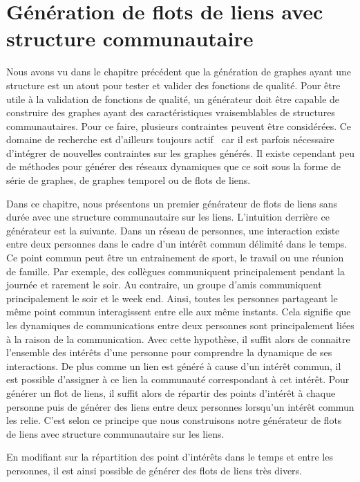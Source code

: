 \chapter{Génération de flots de liens avec structure communautaire}
\minitoc
\label{versQualite}

Nous avons vu dans le chapitre précédent que la génération de graphes ayant une structure est un atout pour tester et valider des fonctions de qualité.
Pour être utile à la validation de fonctions de qualité, un générateur doit être capable de construire des graphes ayant des caractéristiques vraisemblables de structures communautaires.
Pour ce faire, plusieurs contraintes peuvent être considérées.
Ce domaine de recherche est d'ailleurs toujours actif~\cite{Tabourier2011,Obradovic2014} car il est parfois nécessaire d'intégrer de nouvelles contraintes sur les graphes générés.
Il existe cependant peu de méthodes pour générer des réseaux dynamiques que ce soit sous la forme de série de graphes, de graphes temporel ou de flots de liens.


Dans ce chapitre, nous présentons un premier générateur de flots de liens sans durée avec une structure communautaire sur les liens.
L'intuition derrière ce générateur est la suivante.
Dans un réseau de personnes, une interaction existe entre deux personnes dans le cadre d'un intérêt commun délimité dans le temps.
Ce point commun peut être un entrainement de sport, le travail ou une réunion de famille.
Par exemple, des collègues communiquent principalement pendant la journée et rarement le soir.
Au contraire, un groupe d'amis communiquent principalement le soir et le week end.
Ainsi, toutes les personnes partageant le même point commun interagissent entre elle aux même instants.
Cela signifie que les dynamiques de communications entre deux personnes sont principalement liées à la raison de la communication.
Avec cette hypothèse, il suffit alors de connaitre l'ensemble des intérêts d'une personne pour comprendre la dynamique de ses interactions.
De plus comme un lien est généré à cause d'un intérêt commun, il est possible d'assigner à ce lien la communauté correspondant à cet intérêt.
Pour générer un flot de liens, il suffit alors de répartir des points d'intérêt à chaque personne puis de générer des liens entre deux personnes lorsqu'un intérêt commun les relie.
C'est selon ce principe que nous construisons notre générateur de flots de liens avec structure communautaire sur les liens.

En modifiant sur la répartition des point d'intérêts  dans le temps et entre les personnes, il est ainsi possible de générer des flots de liens très divers.

